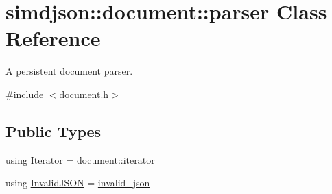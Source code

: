 \hypertarget{classsimdjson_1_1document_1_1parser}{}\section{simdjson\+:\+:document\+:\+:parser Class Reference}
\label{classsimdjson_1_1document_1_1parser}


A persistent document parser.  




{\ttfamily \#include $<$document.\+h$>$}

\subsection*{Public Types}
\begin{DoxyCompactItemize}
\item 
using \hyperlink{classsimdjson_1_1document_1_1parser_af98e5ba546a37967e0bfee969d1d5f48}{Iterator} = \hyperlink{classsimdjson_1_1document__iterator}{document\+::iterator}
\item 
using \hyperlink{classsimdjson_1_1document_1_1parser_a26aa1a76e9ecf5371736aa44b5f6d74a}{Invalid\+J\+S\+ON} = \hyperlink{structsimdjson_1_1invalid__json}{invalid\+\_\+json}
\end{DoxyCompactItemize}
